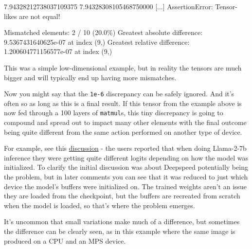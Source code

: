 \documentclass[
]{report}
\newenvironment{Shaded}{\begin{snugshade}}{\end{snugshade}}
\newcommand{\ErrorTok}[1]{\textcolor[rgb]{0.68,0.00,0.00}{#1}}
\newcommand{\ExtensionTok}[1]{\textcolor[rgb]{0.00,0.23,0.31}{#1}}
\newcommand{\KeywordTok}[1]{\textcolor[rgb]{0.00,0.23,0.31}{#1}}
\newcommand{\NormalTok}[1]{\textcolor[rgb]{0.00,0.23,0.31}{#1}}
\begin{document}
\begin{Shaded}
\begin{Highlighting}[]
\ExtensionTok{7.94328212738037109375}
\ExtensionTok{7.94328308105468750000}
\ExtensionTok{[...]}
\ExtensionTok{AssertionError:}\NormalTok{ Tensor{-}likes are not equal!}

\ExtensionTok{Mismatched}\NormalTok{ elements: 2 / 10 }\ErrorTok{(}\ExtensionTok{20.0\%}\KeywordTok{)}
\ExtensionTok{Greatest}\NormalTok{ absolute difference: 9.5367431640625e{-}07 at index }\ErrorTok{(}\ExtensionTok{9,}\KeywordTok{)}
\ExtensionTok{Greatest}\NormalTok{ relative difference: 1.200604771156577e{-}07 at index }\ErrorTok{(}\ExtensionTok{9,}\KeywordTok{)}
\end{Highlighting}
\end{Shaded}

This was a simple low-dimensional example, but in reality the tensors
are much bigger and will typically end up having more mismatches.

Now you might say that the \texttt{1e-6} discrepancy can be safely
ignored. And it's often so as long as this is a final result. If this
tensor from the example above is now fed through a 100 layers of
\texttt{matmul}s, this tiny discrepancy is going to compound and spread
out to impact many other elements with the final outcome being quite
different from the same action performed on another type of device.

For example, see this
\href{https://github.com/microsoft/DeepSpeed/issues/4932}{discussion} -
the users reported that when doing Llama-2-7b inference they were
getting quite different logits depending on how the model was
initialized. To clarify the initial discussion was about Deepspeed
potentially being the problem, but in later comments you can see that it
was reduced to just which device the model's buffers were initialized
on. The trained weights aren't an issue they are loaded from the
checkpoint, but the buffers are recreated from scratch when the model is
loaded, so that's where the problem emerges.

It's uncommon that small variations make much of a difference, but
sometimes the difference can be clearly seen, as in this example where
the same image is produced on a CPU and an MPS device.
\end{document}
